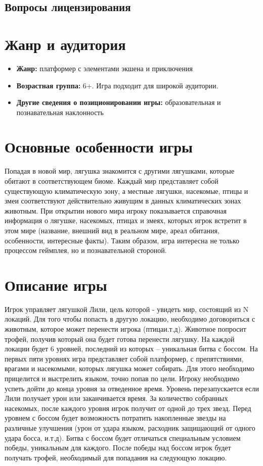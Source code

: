 \documentclass{article}
\begin{document}
\subsection*{Вопросы лицензирования}

\section{Жанр и аудитория}
\begin{itemize}
    \item \textbf{Жанр:} платформер с элементами экшена и приключения
    \item \textbf{Возрастная группа:} 6+. Игра подходит для широкой аудитории.
    \item \textbf{Другие сведения о позиционировании игры:} образовательная и познавательная наклонность
\end{itemize}

\section{Основные особенности игры}
Попадая в новой мир, лягушка знакомится с другими лягушками, которые обитают в соответствующем биоме. Каждый мир представляет собой существующую климатическую зону, а местные лягушки, насекомые, птицы и змеи соответствуют действительно живущим в данных климатических зонах животным. При открытии нового мира игроку показывается справочная информация о лягушке, насекомых, птицах и змеях, которых игрок встретит в этом мире (название, внешний вид в реальном мире, ареал обитания, особенности, интересные факты). Таким образом, игра интересна не только процессом геймплея, но и познавательной стороной.

\section{Описание игры}
Игрок управляет лягушкой Лили, цель которой - увидеть мир, состоящий из N локаций. Для того чтобы попасть в другую локацию, необходимо договориться с животным, которое может перенести игрока (птица и.т.д). Животное попросит трофей, получив который она будет готова перенести лягушку. На каждой локации будет 6 уровней, последний из которых – уникальная битва с боссом. На первых пяти уровнях игра представляет собой платформер, с препятствиями, врагами и насекомыми, которых лягушка может собирать. Для этого необходимо прицелится и выстрелить языком, точно попав по цели. Игроку необходимо успеть дойти до конца уровня за отведенное время. Уровень перезапускается если Лили получает урон или заканчивается время. За количество собранных насекомых, после каждого уровня игрок получит от одной до трех звезд. Перед уровнем с боссом будет возможность потратить накопленные звезды на различные улучшения (урон от удара языком, расходник защищающий от одного удара босса, и.т.д). Битва с боссом будет отличаться специальным условием победы, уникальным для каждого. После победы над боссом игрок будет получать трофей, необходимый для попадания на следующую локацию.
\end{document}

